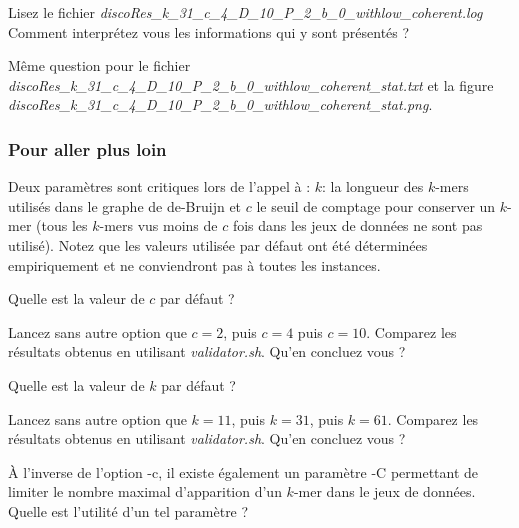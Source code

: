 \qu Lisez le fichier \emph{discoRes\_k\_31\_c\_4\_D\_10\_P\_2\_b\_0\_withlow\_coherent.log}
Comment interprétez vous les informations qui y sont présentés ?

\qu Même question pour le fichier \emph{discoRes\_k\_31\_c\_4\_D\_10\_P\_2\_b\_0\_withlow\_coherent\_stat.txt} et la figure \emph{discoRes\_k\_31\_c\_4\_D\_10\_P\_2\_b\_0\_withlow\_coherent\_stat.png}.


%

\subsubsection*{Pour aller plus loin} %
\label{ssub:pour_aller_plus_loin}
Deux paramètres sont critiques lors de l'appel à \discopp: $k$: la longueur des $k$-mers utilisés dans le graphe de de-Bruijn et $c$ le seuil de comptage pour conserver un $k$-mer (tous les $k$-mers vus moins de $c$ fois dans les jeux de données ne sont pas utilisé). Notez que les valeurs utilisée par défaut ont été déterminées empiriquement et ne conviendront pas à toutes les instances. 

\qu Quelle est la valeur de $c$ par défaut ?

\qu Lancez \discopp sans autre option que $c=2$, puis $c=4$ puis $c=10$. Comparez les résultats obtenus en utilisant \emph{validator.sh}. Qu'en concluez vous ?

\qu Quelle est la valeur de $k$ par défaut ?

\qu Lancez \discopp sans autre option que $k=11$, puis $k=31$, puis $k=61$. Comparez les résultats obtenus en utilisant \emph{validator.sh}. Qu'en concluez vous ?

\qu À l'inverse de l'option -c, il existe également un paramètre -C permettant de limiter le nombre maximal d'apparition d'un $k$-mer dans le jeux de données. Quelle est l'utilité d'un tel paramètre ? 

